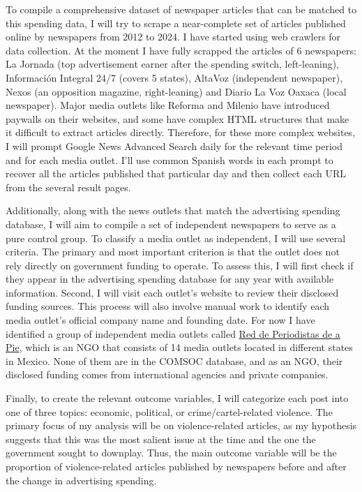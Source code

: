 To compile a comprehensive dataset of newspaper articles that can be matched to this spending data, I will try to scrape a near-complete set of articles published online by newspapers from 2012 to 2024. I have started using web crawlers for data collection. At the moment I have fully scrapped the articles of 6 newspapers: La Jornada (top advertisement earner after the spending switch, left-leaning), Información Integral 24/7 (covers 5 states), AltaVoz (independent newspaper), Nexos (an opposition magazine, right-leaning) and Diario La Voz Oaxaca (local newspaper). Major media outlets like Reforma and Milenio have introduced paywalls on their websites, and some have complex HTML structures that make it difficult to extract articles directly. Therefore, for these more complex websites, I will prompt Google News Advanced Search daily for the relevant time period and for each media outlet. I'll use common Spanish words in each prompt to recover all the articles published that particular day and then collect each URL from the several result pages. 

Additionally, along with the news outlets that match the advertising spending database, I will aim to compile a set of independent newspapers to serve as a pure control group. To classify a media outlet as independent, I will use several criteria. The primary and most important criterion is that the outlet does not rely directly on government funding to operate. To assess this, I will first check if they appear in the advertising spending database for any year with available information. Second, I will visit each outlet’s website to review their disclosed funding sources. This process will also involve manual work to identify each media outlet’s official company name and founding date. For now I have identified a group of independent media outlets called \href{https://periodistasdeapie.org.mx/quienes-somos/}{Red de Periodistas de a Pie}, which is an NGO that consists of 14 media outlets located in different states in Mexico. None of them are in the COMSOC database, and as an NGO, their disclosed funding comes from international agencies and private companies.


Finally, to create the relevant outcome variables, I will categorize each post into one of three topics: economic, political, or crime/cartel-related violence. The primary focus of my analysis will be on violence-related articles, as my hypothesis suggests that this was the most salient issue at the time and the one the government sought to downplay. Thus, the main outcome variable will be the proportion of violence-related articles published by newspapers before and after the change in advertising spending.


